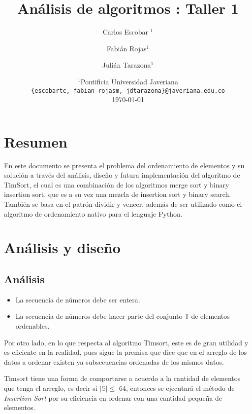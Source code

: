 \documentclass[a4paper]{article}
\title{Análisis de algoritmos : Taller 1}
\author{Carlos Escobar $^1$ \and Fabián Rojas$^1$ \and Julián Tarazona$^1$}
\date{
	$^1$Pontificia Universidad Javeriana \\ \texttt{\{escobartc, fabian-rojasm, jdtarazona\}@javeriana.edu.co}\\%
	\today
}
\theoremstyle{plain}
\theoremstyle{definition}
\begin{document}
	\maketitle
\section{Resumen}
	\label{sec:def}
	\hspace
	En este documento se presenta el problema del ordenamiento de
    elementos y su solución a través del análisis, diseño y futura implementación del algoritmo de TimSort, el cual es
    una combinación de los algoritmos merge sort y binary insertion sort, que es a su vez una mezcla de insertion sort y binary search. 
    También se basa en el patrón dividir y vencer, además de ser utilizado como 
    el algoritmo de ordenamiento nativo para el lenguaje Python. 

	
 
	\section{Análisis y diseño}
	\label{sec:def}
	\subsection{Análisis}
	
	\hspace{El ejercicio parte desde la necesidad de ordenar una secuencia de elementos utilizando el algoritmo de ordenamiento TimSort (algoritmo nativo de Python), el cual sigue el principio de dividir y vencer. Para esto, la secuencia de números a ordenar debe cumplir las siguientes condiciones:}
	
	
	
	\begin{itemize}
	    \item La secuencia de números debe ser entera.
	    \item La secuencia de números debe hacer parte del conjunto $\mathbb{T}$ de elementos ordenables.
	\end{itemize}
	

	Por otro lado, en lo que respecta al algoritmo Timsort, este es de gran utilidad y es eficiente en la realidad, pues sigue la premisa que dice que en el arreglo de los datos a ordenar existen ya subsecuencias ordenadas de los mismos datos.\newline
	
	
	Timsort tiene una forma de comportarse a acuerdo a la cantidad de elementos que tenga el arreglo, es decir si $\mathbb{\lvert S \rvert \leq}$ 64, entonces se ejecutará el método de \textit{Insertion Sort} por su eficiencia en ordenar con una cantidad pequeña de elementos.\newline
		
\end{document}
